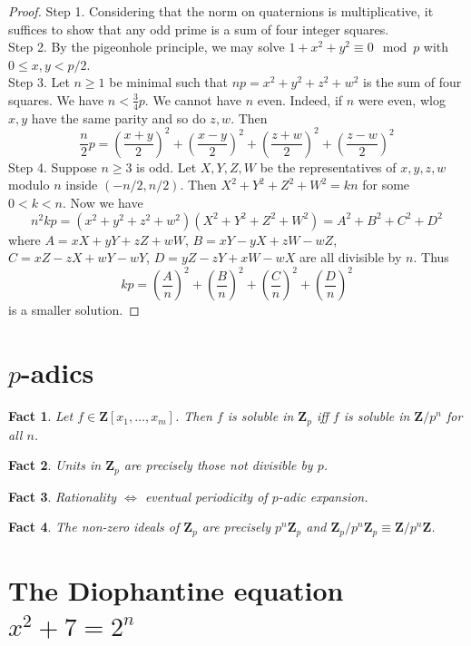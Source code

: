 \documentclass[12pt]{article}
\newtheorem*{fact*}{Fact}
\newcommand{\Z}{\mathbf{Z}}
\begin{document}
\begin{proof}
Step 1. Considering that the norm on quaternions is multiplicative, it suffices to show that any odd prime is a sum of four integer squares. \\
Step 2. By the pigeonhole principle, we may solve $1+x^2+y^2\equiv 0\mod p$ with $0\le x,y < p/2$. \\
Step 3. Let $n\ge 1$ be minimal such that $np=x^2+y^2+z^2+w^2$ is the sum of four squares. We have $n<\frac{3}{4}p$. We cannot have $n$ even. Indeed, if $n$ were even, wlog $x,y$ have the same parity and so do $z,w$. Then \[\frac{n}{2}p = \left(\frac{x+y}{2}\right)^2 + 
\left(\frac{x-y}{2}\right)^2 + 
\left(\frac{z+w}{2}\right)^2 +
\left(\frac{z-w}{2}\right)^2\]
Step 4. Suppose $n\ge 3$ is odd. Let $X,Y,Z,W$ be the representatives of $x,y,z,w$ modulo $n$ inside $(-n/2,n/2)$. Then $X^2+Y^2+Z^2+W^2 = kn$ for some $0<k<n$. Now we have
\[n^2kp = (x^2+y^2+z^2+w^2)(X^2+Y^2+Z^2+W^2) = A^2+B^2+C^2+D^2\]
where
$A=xX+yY+zZ+wW$,
$B=xY-yX+zW-wZ$,
$C=xZ-zX+wY-wY$,
$D=yZ-zY+xW-wX$
are all divisible by $n$. Thus \[kp = \left(\frac{A}{n}\right)^2 + \left(\frac{B}{n}\right)^2 + \left(\frac{C}{n}\right)^2 + \left(\frac{D}{n}\right)^2\]
is a smaller solution.
\end{proof}


\newpage
\section{\texorpdfstring{$p$}{}-adics}

\begin{fact*}
Let $f\in\Z[x_1,\dots,x_m]$. Then $f$ is soluble in $\Z_p$ iff $f$ is soluble in $\Z/p^n$ for all $n$.
\end{fact*}


\begin{fact*}
Units in $\Z_p$ are precisely those not divisible by $p$.
\end{fact*}


\begin{fact*}
Rationality $\iff$ eventual periodicity of $p$-adic expansion.
\end{fact*}


\begin{fact*}
The non-zero ideals of $\Z_p$ are precisely $p^n\Z_p$ and $\Z_p/p^n\Z_p\equiv\Z/p^n\Z$.
\end{fact*}


\newpage
\section{The Diophantine equation \texorpdfstring{$x^2+7=2^n$}{}}
\end{document}
